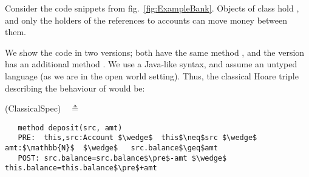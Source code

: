
Consider the code snippets from fig.~\ref{fig:ExampleBank}. Objects of
 class  hold , and only the holders of the references to accounts can move money between them.

 We show the code in two versions; both have the same method , and the  version 
 has an additional method .
  We use a Java-like syntax, and assume an untyped language (as we are in the open world setting).
 Thus, the classical Hoare triple describing the behaviour of  would be:
 
 \vspace{0.1in}
(ClassicalSpec)\ \  $\triangleq$\\ 
\vspace{-0.22in}
\begin{lstlisting}
   method deposit(src, amt)
   PRE:  this,src:Account $\wedge$  this$\neq$src $\wedge$ amt:$\mathbb{N}$  $\wedge$   src.balance$\geq$amt
   POST: src.balance=src.balance$\pre$-amt $\wedge$ this.balance=this.balance$\pre$+amt
\end{lstlisting}
\vspace{-0.1in}

